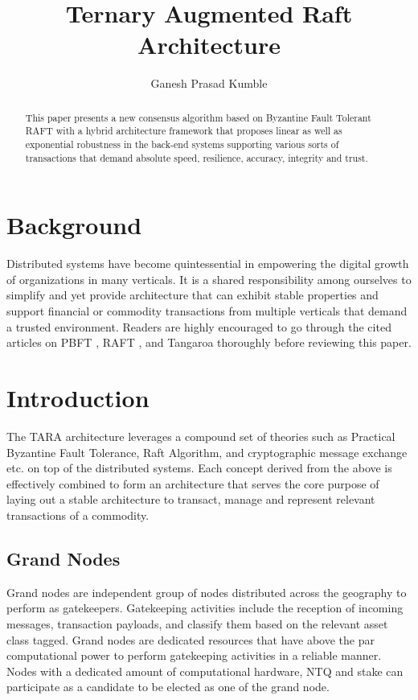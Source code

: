 \documentclass[]{article}
\title{Ternary Augmented Raft Architecture}
\author{Ganesh Prasad Kumble}
\begin{document}
\date{}
\maketitle

\begin{abstract}
This paper presents a new consensus algorithm based on Byzantine Fault Tolerant\cite{ARTICLE:1} RAFT \cite{ARTICLE:2} with a hybrid architecture framework that proposes linear as well as exponential robustness in the back-end systems supporting various sorts of transactions that demand absolute speed, resilience, accuracy, integrity and trust.
\end{abstract}

\section{Background}
Distributed systems have become quintessential in empowering the digital growth of organizations in many verticals. It is a shared responsibility among ourselves to simplify and yet provide architecture that can exhibit stable properties and support financial or commodity transactions from multiple verticals that demand a trusted environment. Readers are highly encouraged to go through the cited articles on PBFT \cite{ARTICLE:1}, RAFT \cite{ARTICLE:2}, and Tangaroa \cite{ARTICLE:3} thoroughly before reviewing this paper.

\section{Introduction}
The TARA architecture leverages a compound set of theories such as Practical Byzantine Fault Tolerance\cite{ARTICLE:1}, Raft Algorithm\cite{ARTICLE:2}, and cryptographic message exchange etc. on top of the distributed systems\cite{ARTICLE:3}. Each concept derived from the above is effectively combined to form an architecture that serves the core purpose of laying out a stable architecture to transact, manage and represent relevant transactions of a commodity.

\subsection{Grand Nodes}
Grand nodes are independent group of nodes distributed across the geography to perform as gatekeepers.
Gatekeeping activities include the reception of incoming messages, transaction payloads, and classify them based on the relevant asset class tagged.
Grand nodes are dedicated resources that have above the par computational power to perform gatekeeping activities in a reliable manner. Nodes with a dedicated amount of computational hardware, NTQ and stake can participate as a candidate to be elected as one of the grand node.
\end{document}
